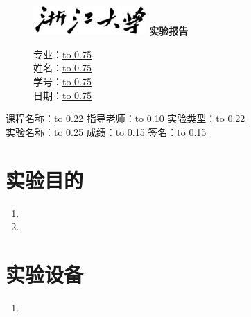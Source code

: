 \documentclass[UTF8,AutoFakeBold]{article}%
\begin{document}
\begin{figure}[t]
    \centering
    \includegraphics[width=4.3cm]{./logo.png}
    \textbf{\Huge\heiti 实验报告}
    \qquad\qquad
    \parbox[b]{4cm}{
        专业：\underline{\hbox to 0.75\linewidth{\hfill 自动化（电气）\hfill}}\\

        \vspace{-1.5ex}
        姓名：\underline{\hbox to 0.75\linewidth{\hfill 林华鹏 \hfill}}\\

        \vspace{-1.5ex}
        学号：\underline{\hbox to 0.75\linewidth{\hfill 3190102323 \hfill}}\\

        \vspace{-1.5ex}
        日期：\underline{\hbox to 0.75\linewidth{\hfill  \hfill}}\\
    }
\end{figure}
\vspace{6ex}
\parbox{0.8\linewidth}{
    \setlength{\baselineskip}{17pt}
    课程名称：\underline{\hbox to 0.22\linewidth{\hfill \hfill}}
    指导老师：\underline{\hbox to 0.10\linewidth{\hfill\hfill}}
    实验类型：\underline{\hbox to 0.22\linewidth{\hfill \hfill}}\\
    实验名称：\underline{\hbox to 0.25\linewidth{\hfill \hfill}}
    成绩：\underline{\hbox to 0.15\linewidth{\hfill \hfill}}
    签名：\underline{\hbox to 0.15\linewidth{\hfill \hfill}}
}
\vspace*{6ex}
\section{实验目的}
\begin{enumerate}
    \item 
    \item 
\end{enumerate}


\section{实验设备}
\begin{enumerate}
    \item
\end{enumerate}
\end{document}
